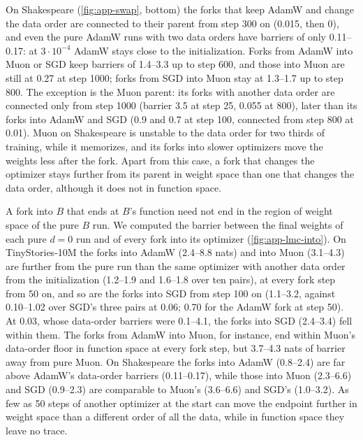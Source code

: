 \documentclass[10pt]{article}
\makeatletter
\renewcommand\paragraph{\@startsection{paragraph}{4}{\z@}{1.2ex \@plus .4ex \@minus .2ex}{-1em}{\normalfont\normalsize\bfseries}}
\newcommand{\extra}{\textsuperscript{\dag}}  %
\makeatother
\begin{document}
On Shakespeare (\cref{fig:app-swap}, bottom) the forks that keep AdamW and change the data order are connected
to their parent from step 300 on (0.015, then 0), and even the pure AdamW runs with two data orders have
barriers of only 0.11--0.17: at $3\cdot10^{-4}$ AdamW stays close to the initialization. Forks from AdamW into Muon or
SGD keep barriers of 1.4--3.3 up to step 600, and those into Muon are still at 0.27 at step 1000; forks from SGD
into Muon stay at 1.3--1.7 up to step 800. The exception is the Muon parent: its forks with another data order
are connected only from step 1000 (barrier 3.5 at step 25, 0.055 at 800), later than its forks into AdamW and
SGD (0.9 and 0.7 at step 100, connected from step 800 at 0.01). Muon on Shakespeare is unstable to the data
order for two thirds of training,
while it memorizes, and its forks into slower optimizers move the weights less after the fork. Apart from this
case, a fork that changes the optimizer stays further from its parent in weight space than one that changes
the data order, although it does not in function space.

\paragraph{Do swaps end in the new optimizer's basin?\extra} A fork into $B$ that ends at $B$'s function need not end
in the region of weight space of the pure $B$ run. We computed the barrier between the final weights of each pure
$d=0$ run and of every fork into its optimizer (\cref{fig:app-lmc-into}). On TinyStories-10M the forks into AdamW
(2.4--8.8 nats) and into Muon (3.1--4.3) are further from the pure run than the same optimizer with another data
order from the initialization (1.2--1.9 and 1.6--1.8 over ten pairs), at every fork step from 50 on, and so are the
forks into SGD from step 100 on (1.1--3.2, against 0.10--1.02 over SGD's three pairs at 0.06; 0.70 for the AdamW
fork at step 50). At 0.03, whose data-order barriers were 0.1--4.1, the forks into SGD (2.4--3.4) fell within
them. The forks from AdamW into Muon, for instance, end within Muon's
data-order floor in function space at every fork step, but 3.7--4.3 nats of barrier away from pure Muon. On
Shakespeare the forks into AdamW (0.8--2.4) are far above AdamW's data-order barriers (0.11--0.17), while those
into Muon (2.3--6.6) and SGD (0.9--2.3) are comparable to Muon's (3.6--6.6) and SGD's (1.0--3.2). As few as 50 steps of another
optimizer at the start can move the endpoint further in weight space than a different order of all the data,
while in function space they leave no trace.
\end{document}
